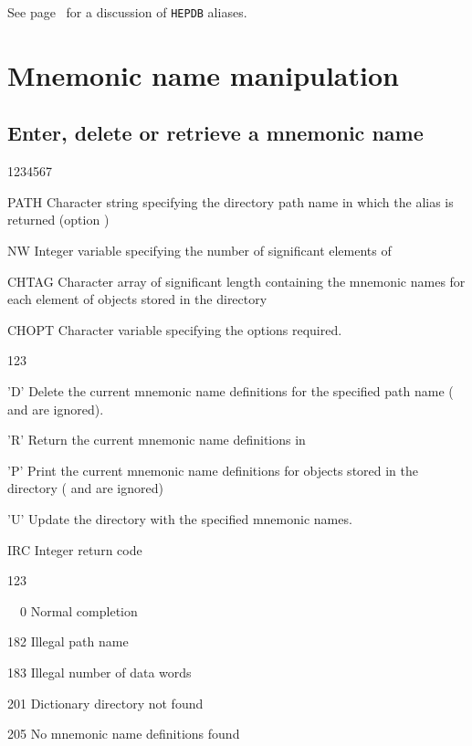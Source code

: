 See page~\pageref{HDB-ALIAS} for a discussion of {\tt HEPDB} aliases.

\section{Mnemonic name manipulation}

\subsection{Enter, delete or retrieve a mnemonic name}


\begin{DLtt}{1234567}
\item[PATH]Character string specifying the directory path name
  in which the alias is returned (option )
\item[NW]Integer variable specifying the number of significant
  elements of 
\item[CHTAG]Character array of significant length
             containing the mnemonic names for each
            element of objects stored in the directory 
\item[CHOPT]Character variable specifying the options required.
  \begin{DLtt}{123}
    \item['D']Delete the current mnemonic name definitions for the specified
    path name ( and  are ignored).
    \item['R']Return the current mnemonic name definitions in 
    \item['P']Print the current mnemonic name definitions for objects stored
    in the directory  ( and  are ignored)
    \item['U']Update the  directory with the specified
    mnemonic names.
  \end{DLtt}
\item[IRC]Integer return code
  \begin{DLtt}{123}
    \item[\ \ 0]Normal completion
    \item[182]Illegal path name
    \item[183]Illegal number of data words
    \item[201]Dictionary directory not found
    \item[205]No mnemonic name definitions found
\end{DLtt}
\end{DLtt}

